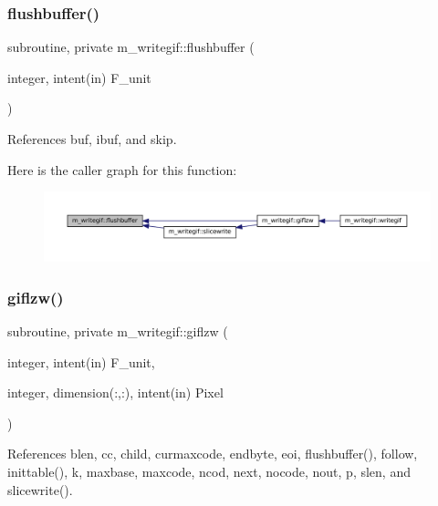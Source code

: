 \subsubsection{\texorpdfstring{flushbuffer()}{flushbuffer()}}
{\footnotesize\ttfamily subroutine, private m\+\_\+writegif\+::flushbuffer (\begin{DoxyParamCaption}\item[{integer, intent(in)}]{F\+\_\+unit }\end{DoxyParamCaption})\hspace{0.3cm}{\ttfamily [private]}}



References buf, ibuf, and skip.

Here is the caller graph for this function\+:\nopagebreak
\begin{figure}[H]
\begin{center}
\leavevmode
\includegraphics[width=350pt]{namespacem__writegif_a48c5ca5487be9dbe565c0d4f8aa02d0d_icgraph}
\end{center}
\end{figure}
\mbox{\label{namespacem__writegif_a13c09be69495f4ba21ecb7c134216a17}} 
\subsubsection{\texorpdfstring{giflzw()}{giflzw()}}
{\footnotesize\ttfamily subroutine, private m\+\_\+writegif\+::giflzw (\begin{DoxyParamCaption}\item[{integer, intent(in)}]{F\+\_\+unit,  }\item[{integer, dimension(\+:,\+:), intent(in)}]{Pixel }\end{DoxyParamCaption})\hspace{0.3cm}{\ttfamily [private]}}



References blen, cc, child, curmaxcode, endbyte, eoi, flushbuffer(), follow, inittable(), k, maxbase, maxcode, ncod, next, nocode, nout, p, slen, and slicewrite().

